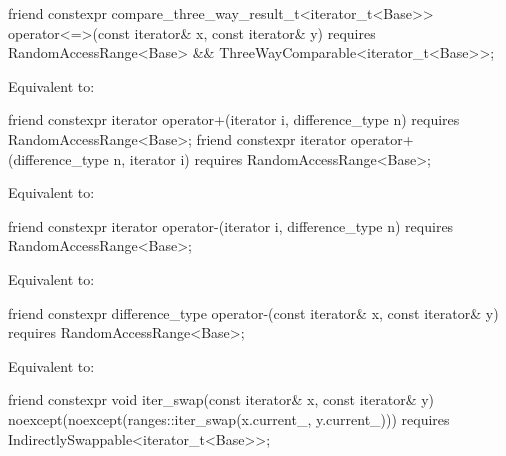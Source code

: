 %
\begin{itemdecl}
friend constexpr compare_three_way_result_t<iterator_t<Base>>
  operator<=>(const iterator& x, const iterator& y)
    requires RandomAccessRange<Base> && ThreeWayComparable<iterator_t<Base>>;
\end{itemdecl}

\begin{itemdescr}
\pnum
\effects Equivalent to: 
\end{itemdescr}

\begin{itemdecl}
friend constexpr iterator operator+(iterator i, difference_type n)
  requires RandomAccessRange<Base>;
friend constexpr iterator operator+(difference_type n, iterator i)
  requires RandomAccessRange<Base>;
\end{itemdecl}

\begin{itemdescr}
\pnum
\effects Equivalent to: 
\end{itemdescr}

%
\begin{itemdecl}
friend constexpr iterator operator-(iterator i, difference_type n)
  requires RandomAccessRange<Base>;
\end{itemdecl}

\begin{itemdescr}
\pnum
\effects Equivalent to: 
\end{itemdescr}

%
\begin{itemdecl}
friend constexpr difference_type operator-(const iterator& x, const iterator& y)
  requires RandomAccessRange<Base>;
\end{itemdecl}

\begin{itemdescr}
\pnum
\effects Equivalent to: 
\end{itemdescr}

\begin{itemdecl}
friend constexpr void iter_swap(const iterator& x, const iterator& y)
  noexcept(noexcept(ranges::iter_swap(x.current_, y.current_)))
  requires IndirectlySwappable<iterator_t<Base>>;
\end{itemdecl}

